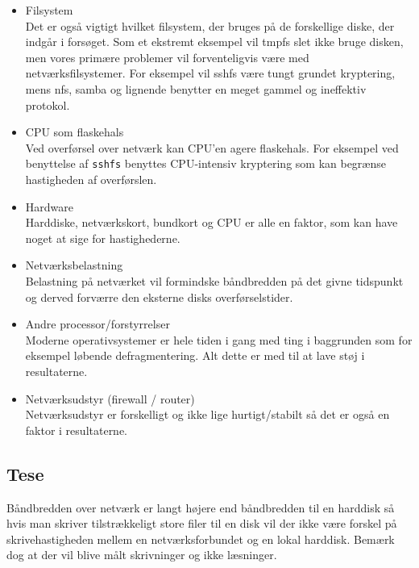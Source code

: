 \documentclass{article}
\begin{document}
\begin{itemize}
\item Filsystem \\
Det er også vigtigt hvilket filsystem, der bruges på de forskellige diske, der indgår i forsøget. Som et ekstremt eksempel vil tmpfs slet ikke bruge disken, men vores primære problemer vil forventeligvis være med netværksfilsystemer. For eksempel vil sshfs være tungt grundet kryptering, mens nfs, samba og lignende benytter en meget gammel og ineffektiv protokol.

\item CPU som flaskehals \\
Ved overførsel over netværk kan CPU'en agere flaskehals. For eksempel ved benyttelse af {\tt sshfs} benyttes CPU-intensiv kryptering som kan begrænse hastigheden af overførslen.

\item Hardware \\
Harddiske, netværkskort, bundkort og CPU er alle en faktor, som kan have noget at sige for hastighederne.

\item Netværksbelastning \\
Belastning på netværket vil formindske båndbredden på det givne tidspunkt og derved forværre den eksterne disks overførselstider.

\item Andre processor/forstyrrelser \\
Moderne operativsystemer er hele tiden i gang med ting i baggrunden som for eksempel løbende defragmentering. Alt dette er med til at lave støj i resultaterne.

\item Netværksudstyr (firewall / router) \\
Netværksudstyr er forskelligt og ikke lige hurtigt/stabilt så det er også en faktor i resultaterne.

\end{itemize}

\subsection{Tese}
Båndbredden over netværk er langt højere end båndbredden til en harddisk så hvis man skriver tilstrækkeligt store filer til en disk vil der ikke være forskel på skrivehastigheden mellem en netværksforbundet og en lokal harddisk. Bemærk dog at der vil blive målt skrivninger og ikke læsninger.
\end{document}
